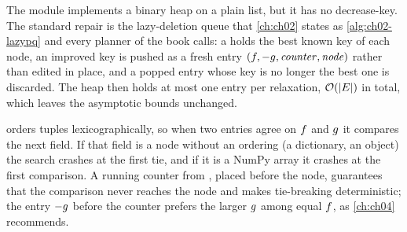 The  module implements a binary heap on a plain list, but it has
no decrease-key. The standard repair is the lazy-deletion queue that
\cref{ch:ch02} states as \cref{alg:ch02-lazypq} and every planner of the book
calls: a  holds the best known key of each node, an improved key is
pushed as a fresh entry $(f, -g, \mathit{counter}, \mathit{node})$
rather than edited in place, and a popped entry whose key is no longer the best
one is discarded. The heap then holds at most one entry per relaxation,
$\mathcal{O}\!\left(\left\lvert E \right\rvert\right)$ in total, which leaves the asymptotic bounds unchanged.

\begin{pitfall}
 orders tuples lexicographically, so when two entries agree on $f$ and $g$ it compares the next field. If that field is a node without an ordering (a dictionary, an object) the search crashes at the first tie, and if it is a NumPy array it crashes at the first comparison. A running counter from , placed before the node, guarantees that the comparison never reaches the node and makes tie-breaking deterministic; the entry $-g$ before the counter prefers the larger $g$ among equal $f$, as \cref{ch:ch04} recommends.
\end{pitfall}

